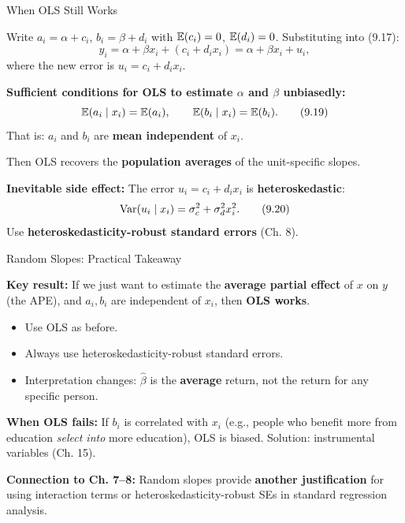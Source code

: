 \documentclass[aspectratio=169, 12pt]{beamer}
\begin{document}
\begin{frame}[shrink=20]{When OLS Still Works}

  Write $a_i = \alpha + c_i$, $b_i = \beta + d_i$ with $\operatorname{\mathbb{E}}(c_i) = 0$, $\operatorname{\mathbb{E}}(d_i) = 0$.
  Substituting into (9.17):
  \[
    y_i = \alpha + \beta x_i + (c_i + d_i x_i) = \alpha + \beta x_i + u_i, \tag{9.18}
  \]
  where the new error is $u_i = c_i + d_i x_i$.

  \begin{highlightbox}
    \textbf{Sufficient conditions for OLS to estimate $\alpha$ and $\beta$ unbiasedly:}
    \[
      \operatorname{\mathbb{E}}(a_i \mid x_i) = \operatorname{\mathbb{E}}(a_i),\qquad \operatorname{\mathbb{E}}(b_i \mid x_i) = \operatorname{\mathbb{E}}(b_i). \tag{9.19}
    \]
    That is: $a_i$ and $b_i$ are \textbf{mean independent} of $x_i$.

    \medskip
    Then OLS recovers the \textbf{population averages} of the unit-specific slopes.
  \end{highlightbox}

  \begin{keybox}
    \textbf{Inevitable side effect:} The error $u_i = c_i + d_i x_i$ is
    \textbf{heteroskedastic}:
    \[
      \operatorname{Var}(u_i \mid x_i) = \sigma_c^2 + \sigma_d^2 x_i^2. \tag{9.20}
    \]
    Use \textbf{heteroskedasticity-robust standard errors} (Ch. 8).
  \end{keybox}

\end{frame}

\begin{frame}[shrink=5]{Random Slopes: Practical Takeaway}

  \begin{keybox}
    \textbf{Key result:} If we just want to estimate the \textbf{average partial effect}
    of $x$ on $y$ (the APE), and $a_i, b_i$ are independent of $x_i$, then
    \textbf{OLS works}.
    \begin{itemize}\setlength{\itemsep}{1pt}
      \item Use OLS as before.
      \item Always use heteroskedasticity-robust standard errors.
      \item Interpretation changes: $\hat\beta$ is the \textbf{average} return, not the return
      for any specific person.
    \end{itemize}
  \end{keybox}

  \begin{highlightbox}
    \textbf{When OLS fails:} If $b_i$ is correlated with $x_i$ (e.g., people who benefit
    more from education \emph{select into} more education), OLS is biased.
    Solution: instrumental variables (Ch. 15).
  \end{highlightbox}

  \textbf{Connection to Ch. 7--8:} Random slopes provide \textbf{another justification} for
  using interaction terms or heteroskedasticity-robust SEs in standard regression analysis.

\end{frame}
\end{document}
